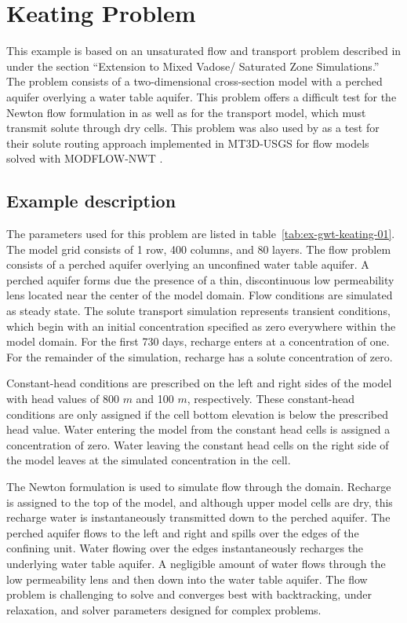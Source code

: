 \section{Keating Problem}

This example is based on an unsaturated flow and transport problem described in \cite{keating2009stable} under the section ``Extension to Mixed Vadose/ Saturated Zone Simulations.''  The problem consists of a two-dimensional cross-section model with a perched aquifer overlying a water table aquifer.  This problem offers a difficult test for the Newton flow formulation in \mf as well as for the transport model, which must transmit solute through dry cells.  This problem was also used by \cite{mt3dusgs} as a test for their solute routing approach implemented in MT3D-USGS for flow models solved with MODFLOW-NWT \citep{modflownwt}.

\subsection{Example description}

The parameters used for this problem are listed in table~\ref{tab:ex-gwt-keating-01}.  The model grid consists of 1 row, 400 columns, and 80 layers.  The flow problem consists of a perched aquifer overlying an unconfined water table aquifer.  A perched aquifer forms due the presence of a thin, discontinuous low permeability lens located near the center of the model domain.  Flow conditions are simulated as steady state.  The solute transport simulation represents transient conditions, which begin with an initial concentration specified as zero everywhere within the model domain.  For the first 730 days, recharge enters at a concentration of one.  For the remainder of the simulation, recharge has a solute concentration of zero.

Constant-head conditions are prescribed on the left and right sides of the model with head values of 800 $m$ and 100 $m$, respectively.  These constant-head conditions are only assigned if the cell bottom elevation is below the prescribed head value.  Water entering the model from the constant head cells is assigned a concentration of zero.  Water leaving the constant head cells on the right side of the model leaves at the simulated concentration in the cell.  

The Newton formulation is used to simulate flow through the domain.  Recharge is assigned to the top of the model, and although upper model cells are dry, this recharge water is instantaneously transmitted down to the perched aquifer.  The perched aquifer flows to the left and right and spills over the edges of the confining unit.  Water flowing over the edges instantaneously recharges the underlying water table aquifer.  A negligible amount of water flows through the low permeability lens and then down into the water table aquifer.  The flow problem is challenging to solve and converges best with backtracking, under relaxation, and solver parameters designed for complex problems.

